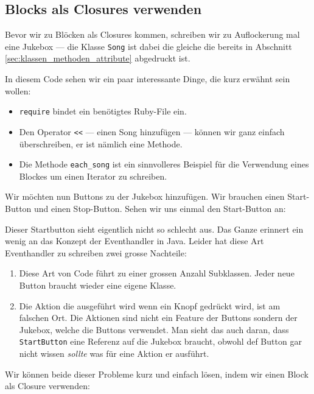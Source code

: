 \documentclass[a4book,11pt,twoside]{scrbook}
\begin{document}
\subsection*{Blocks als Closures verwenden} %
\label{sub:blocks_als_closures_verwenden}
Bevor wir zu Blöcken als Closures kommen, schreiben wir  zu Auflockerung mal eine Jukebox — die Klasse \texttt{Song} ist dabei die gleiche die bereits in Abschnitt \ref{sec:klassen_methoden_attribute} abgedruckt ist.



In diesem Code sehen wir ein paar interessante Dinge, die kurz erwähnt sein wollen:

\begin{itemize}
	\item \texttt{require} bindet ein benötigtes Ruby-File ein.
	\item Den Operator \texttt{<<} — einen Song hinzufügen — können wir ganz einfach überschreiben, er ist nämlich eine Methode.
	\item Die Methode \texttt{each\_song} ist ein sinnvolleres Beispiel für die Verwendung eines Blockes um einen Iterator zu schreiben.
\end{itemize}

Wir möchten nun Buttons zu der Jukebox hinzufügen. Wir brauchen einen Start-Button und einen Stop-Button. Sehen wir uns einmal den Start-Button an:





Dieser Startbutton sieht eigentlich nicht so schlecht aus. Das Ganze erinnert ein wenig an das Konzept der Eventhandler in Java. Leider hat diese Art Eventhandler zu schreiben zwei grosse Nachteile:
\begin{enumerate}
	\item Diese Art von Code führt zu einer grossen Anzahl Subklassen. Jeder neue Button braucht wieder eine eigene Klasse.
	\item Die Aktion die ausgeführt wird wenn ein Knopf gedrückt wird, ist am falschen Ort. Die Aktionen sind nicht ein Feature der Buttons sondern der Jukebox, welche die Buttons verwendet. Man sieht das auch daran, dass \texttt{StartButton} eine Referenz auf die Jukebox braucht, obwohl def Button gar nicht wissen \emph{sollte} was für eine Aktion er ausführt.
\end{enumerate}

Wir können beide dieser Probleme kurz und einfach lösen, indem wir einen Block als Closure verwenden:
\end{document}
